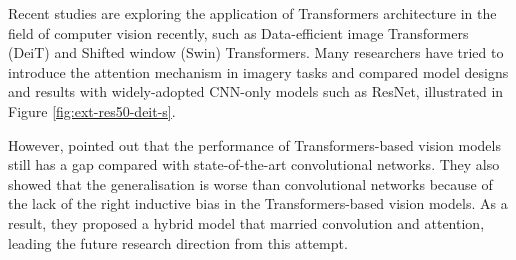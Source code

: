 Recent studies are exploring the application of Transformers architecture in the field of computer vision recently, such as Data-efficient image Transformers (DeiT) and Shifted window (Swin) Transformers.
Many researchers have tried to introduce the attention mechanism in imagery tasks and compared model designs and results with widely-adopted CNN-only models such as ResNet, illustrated in Figure \ref{fig:ext-res50-deit-s}.

However, \citet{dai2021coatnet} pointed out that the performance of Transformers-based vision models still has a gap compared with state-of-the-art convolutional networks.
They also showed that the generalisation is worse than convolutional networks because of the lack of the right inductive bias in the Transformers-based vision models.
As a result, they proposed a hybrid model that married convolution and attention, leading the future research direction from this attempt.